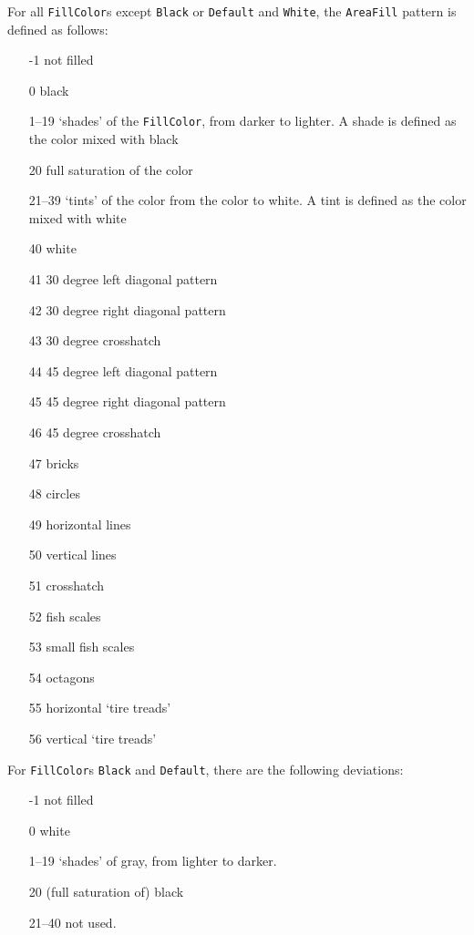 \documentclass[10pt, a4paper]{article}
\begin{document}
For all \texttt{FillColor}s except \texttt{Black} or \texttt{Default} and \texttt{White}, 
the \texttt{AreaFill} pattern is defined as follows: 
%
\begin{enumerate}
\item[-1]    not filled
\item[0]     black
\item[1--19]  `shades' of the \texttt{FillColor}, from darker to lighter.
             A shade is defined as the color mixed with black
\item[20]    full saturation of the color
\item[21--39] `tints' of the color from the color to white.
             A tint is defined as the color mixed with white
\item[40]    white
\item[41]    30 degree left diagonal pattern
\item[42]    30 degree right diagonal pattern
\item[43]    30 degree crosshatch
\item[44]    45 degree left diagonal pattern
\item[45]    45 degree right diagonal pattern
\item[46]    45 degree crosshatch
\item[47]    bricks
\item[48]    circles
\item[49]    horizontal lines
\item[50]    vertical lines
\item[51]    crosshatch
\item[52]    fish scales
\item[53]    small fish scales
\item[54]    octagons
\item[55]    horizontal `tire treads'
\item[56]    vertical `tire treads'
\end{enumerate}

For \texttt{FillColor}s \texttt{Black} and \texttt{Default}, 
there are the following deviations: 
%
\begin{enumerate}
\item[-1]    not filled
\item[0]     white
\item[1--19]  `shades' of gray, from lighter to darker.
\item[20]    (full saturation of) black
\item[21--40] not used. 
\end{enumerate}
\end{document}
